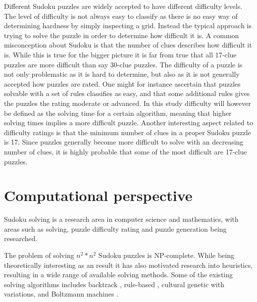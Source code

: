 \documentclass[a4paper,11pt]{kth-mag}
\begin{document}
Different Sudoku puzzles are widely accepted to have different difficulty levels.
The level of difficulty is not always easy to classify as there is no easy way of determining hardness by simply inspecting a grid.
Instead the typical approach is trying to solve the puzzle in order to determine how difficult it is.
A common misconception about Sudoku is that the number of clues describes how difficult it is.
While this is true for the bigger picture it is far from true that all 17-clue puzzles are more difficult than say 30-clue puzzles.\cite{sudokuDifficulty}
The difficulty of a puzzle is not only problematic as it is hard to determine, but also as it is not generally accepted how puzzles are rated.
One might for instance ascertain that puzzles solvable with a set of rules classifies as easy, and that some additional rules gives the puzzles the rating moderate or advanced.
In this study difficulty will however be defined as the solving time for a certain algorithm, meaning that higher solving times implies a more difficult puzzle.
Another interesting aspect related to difficulty ratings is that the minimum number of clues in a proper Sudoku puzzle is 17.\cite{17clueProof} 
Since puzzles generally become more difficult to solve with an decreasing number of clues, it is highly probable that some of the most difficult are 17-clue puzzles. 

\FloatBarrier
\section{Computational perspective}
Sudoku solving is a research area in computer science and mathematics, with areas such as solving, puzzle difficulty rating and puzzle generation being researched.\cite{stochastic, sudokuConstruct, generation}

The problem of solving $n^2 * n^2$ Sudoku puzzles is NP-complete.\cite{complexity}
While being theoretically interesting as an result it has also motivated research into heuristics, resulting in a wide range of available solving methods.
Some of the existing solving algorithms includes backtrack \cite{searchBased}, rule-based \cite{techniques}, cultural genetic with variations\cite{stochastic}, and Boltzmann machines \cite{boltzmann}.
\end{document}
